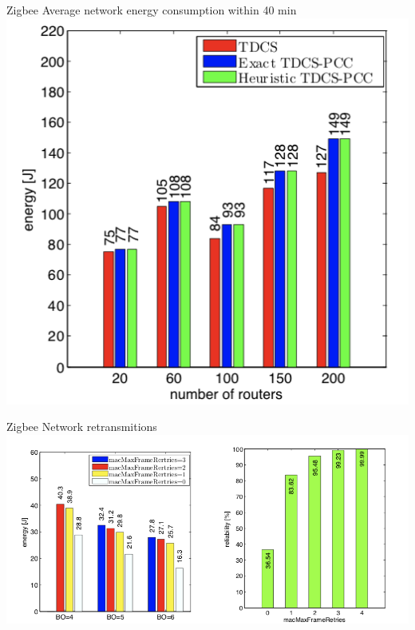 \documentclass[serif,Blue]{beamer}
\begin{document}
\begin{frame}{Zigbee}
	Average network energy consumption within 40 min
	\center\includegraphics[scale=.5]{img/fig17.png}
\end{frame}

\begin{frame}{Zigbee}
	Network retransmitions
	\center\includegraphics[scale=.5]{img/fig1819.png}
\end{frame}
\end{document}
